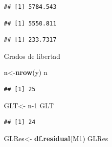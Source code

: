 \documentclass[
]{book}
\newenvironment{Shaded}{\begin{snugshade}}{\end{snugshade}}
\newcommand{\DecValTok}[1]{\textcolor[rgb]{0.00,0.00,0.81}{#1}}
\newcommand{\FunctionTok}[1]{\textcolor[rgb]{0.13,0.29,0.53}{\textbf{#1}}}
\newcommand{\NormalTok}[1]{#1}
\newcommand{\OtherTok}[1]{\textcolor[rgb]{0.56,0.35,0.01}{#1}}
\newcommand{\SpecialCharTok}[1]{\textcolor[rgb]{0.81,0.36,0.00}{\textbf{#1}}}
\begin{document}
\begin{verbatim}
## [1] 5784.543
\end{verbatim}

\begin{Shaded}
\end{Shaded}

\begin{verbatim}
## [1] 5550.811
\end{verbatim}

\begin{Shaded}
\end{Shaded}

\begin{verbatim}
## [1] 233.7317
\end{verbatim}

Grados de libertad

\begin{Shaded}
\begin{Highlighting}[]
\NormalTok{n}\OtherTok{\textless{}{-}}\FunctionTok{nrow}\NormalTok{(y)}
\NormalTok{n}
\end{Highlighting}
\end{Shaded}

\begin{verbatim}
## [1] 25
\end{verbatim}

\begin{Shaded}
\begin{Highlighting}[]
\NormalTok{GLT}\OtherTok{\textless{}{-}}\NormalTok{ n}\DecValTok{{-}1}
\NormalTok{GLT}
\end{Highlighting}
\end{Shaded}

\begin{verbatim}
## [1] 24
\end{verbatim}

\begin{Shaded}
\begin{Highlighting}[]
\NormalTok{GLRes}\OtherTok{\textless{}{-}} \FunctionTok{df.residual}\NormalTok{(M1)}
\NormalTok{GLRes}
\end{Highlighting}
\end{Shaded}
\end{document}
